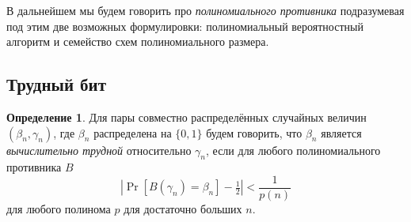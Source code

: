 \documentclass[12pt,a4paper]{article}
\newcommand{\bits}{\{0,1\}}
\theoremstyle{definition}
\newtheorem{definition}{Определение}[section]
\theoremstyle{plain}
\theoremstyle{remark}
\begin{document}
В дальнейшем мы будем говорить про \emph{полиномиального противника}
подразумевая под этим две возможных формулировки: полиномиальный
вероятностный алгоритм и семейство схем полиномиального размера.

\subsection{Трудный бит}
\begin{definition}
Для пары совместно распределённых случайных величин $(\beta_n,\gamma_n)$, где $\beta_n$ распределена на
$\bits$ будем говорить, что $\beta_n$ является \emph{вычислительно трудной} относительно $\gamma_n$, 
если для любого полиномиального противника $B$
$$\left|\Pr[B(\gamma_n) = \beta_n] - \tfrac12\right| < \frac{1}{p(n)}$$
для любого полинома $p$ для достаточно больших $n$.
\end{definition}
\end{document}
